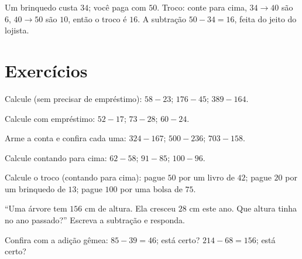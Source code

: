 \begin{example}\label{ex:g2:subtraction:change}
Um brinquedo custa $34$; você paga com $50$. Troco: conte para cima,
$34 \to 40$ são $6$, $40 \to 50$ são $10$, então o troco é $16$. A
subtração $50 - 34 = 16$, feita do jeito do lojista.
\end{example}

\section{Exercícios}

\begin{exercise}[$\star$]\label{exo:g2:subtraction:1}
Calcule (sem precisar de empréstimo): $58 - 23$; \quad $176 - 45$;
\quad $389 - 164$.
\end{exercise}

\begin{exercise}[$\star$]\label{exo:g2:subtraction:2}
Calcule com empréstimo: $52 - 17$; \quad $73 - 28$; \quad
$60 - 24$.
\end{exercise}

\begin{exercise}[$\star$]\label{exo:g2:subtraction:3}
Arme a conta e confira cada uma: $324 - 167$; \quad
$500 - 236$; \quad $703 - 158$.
\end{exercise}

\begin{exercise}[$\star$]\label{exo:g2:subtraction:4}
Calcule contando para cima: $62 - 58$; \quad $91 - 85$; \quad
$100 - 96$.
\end{exercise}

\begin{exercise}[$\star$]\label{exo:g2:subtraction:5}
Calcule o troco (contando para cima): pague $50$ por um livro de
$42$; pague $20$ por um brinquedo de $13$; pague $100$ por uma bolsa
de $75$.
\end{exercise}

\begin{exercise}[$\star$]\label{exo:g2:subtraction:6}
``Uma árvore tem $156$ cm de altura. Ela cresceu $28$ cm este ano.
Que altura tinha no ano passado?'' Escreva a subtração e responda.
\end{exercise}

\begin{exercise}[$\star$]\label{exo:g2:subtraction:7}
Confira com a adição gêmea: $85 - 39 = 46$; está certo?
$214 - 68 = 156$; está certo?
\end{exercise}

